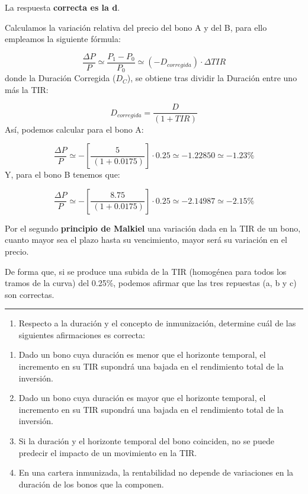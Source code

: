 \documentclass[
  letterpaper,
  DIV=11,
  numbers=noendperiod]{scrreprt}
\providecommand{\tightlist}{%
  \setlength{\itemsep}{0pt}\setlength{\parskip}{0pt}}\usepackage{longtable,booktabs,array}
\begin{document}
\begin{tcolorbox}
\begin{tcolorbox}[enhanced jigsaw, toprule=.15mm, left=2mm, arc=.35mm, breakable, bottomrule=.15mm, opacityback=0, rightrule=.15mm, leftrule=.75mm, colframe=quarto-callout-note-color-frame, colback=white]
\begin{minipage}[t]{\textwidth - 5.5mm}
La respuesta \textbf{correcta es la d}.

Calculamos la variación relativa del precio del bono A y del B, para
ello empleamos la siguiente fórmula:

\[\frac{\Delta P}{P}\simeq  \frac{P_1-P_0}{P_0}\simeq \left(-D_{corregida}\right)\cdot\Delta TIR\]
donde la Duración Corregida (\(D_C\)), se obtiene tras dividir la
Duración entre uno más la TIR:

\[D_{corregida}=\frac{D}{\left(1+TIR\right)}\] Así, podemos calcular
para el bono A:

\[\frac{\Delta P}{P}\simeq-\left[\frac{5}{\:\left(1+0.0175\right)}\right]\cdot 0.25\simeq-1.22850\simeq-1.23\%\]
Y, para el bono B tenemos que:

\[\frac{\Delta P}{P}\simeq-\left[\frac{8.75}{\:\left(1+0.0175\right)}\right]\cdot 0.25\simeq-2.14987\simeq
-2.15\%\]

Por el segundo \textbf{principio de Malkiel} una variación dada en la
TIR de un bono, cuanto mayor sea el plazo hasta su vencimiento, mayor
será su variación en el precio.

De forma que, si se produce una subida de la TIR (homogénea para todos
los tramos de la curva) del 0.25\%, podemos afirmar que las tres
repuestas (a, b y c) son correctas.

\end{minipage}%
\end{tcolorbox}

\begin{center}\rule{0.5\linewidth}{0.5pt}\end{center}

\begin{enumerate}
\def\labelenumi{\arabic{enumi}.}
\setcounter{enumi}{3}
\tightlist
\item
  Respecto a la duración y el concepto de inmunización, determine cuál
  de las siguientes afirmaciones es correcta:
\end{enumerate}

\begin{enumerate}
\def\labelenumi{\alph{enumi}.}
\item
  Dado un bono cuya duración es menor que el horizonte temporal, el
  incremento en su TIR supondrá una bajada en el rendimiento total de la
  inversión.
\item
  Dado un bono cuya duración es mayor que el horizonte temporal, el
  incremento en su TIR supondrá una bajada en el rendimiento total de la
  inversión.
\item
  Si la duración y el horizonte temporal del bono coinciden, no se puede
  predecir el impacto de un movimiento en la TIR.
\item
  En una cartera inmunizada, la rentabilidad no depende de variaciones
  en la duración de los bonos que la componen.
\end{enumerate}


\end{tcolorbox}
\end{document}
